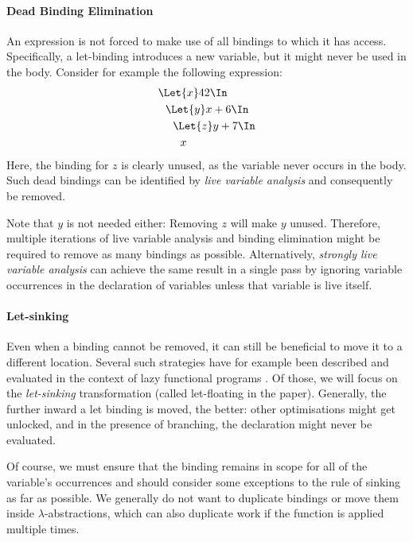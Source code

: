   \paragraph{Dead Binding Elimination}
    An expression is not forced to make use of all bindings to which it has access.
    Specifically, a let-binding introduces a new variable, but it might never be used
    in the body.
    Consider for example the following expression:
    \begin{align*}
      &\Let{x} 42 \In            \\
      &\ \ \Let{y} x + 6 \In     \\
      &\ \ \ \ \Let{z} y + 7 \In \\
      &\ \ \ \ \ \ x
    \end{align*}
    Here, the binding for $z$ is clearly unused, as the variable never occurs in the body.
    Such dead bindings can be identified by \emph{live variable analysis}
    and consequently be removed.

    Note that $y$ is not needed either: Removing $z$ will make $y$ unused.
    Therefore, multiple iterations of live variable analysis and binding elimination
    might be required to remove as many bindings as possible.
    Alternatively, \emph{strongly live variable analysis} can achieve the same result in a single pass
    by ignoring variable occurrences in the declaration of variables
    unless that variable is live itself.

  \paragraph{Let-sinking}
    Even when a binding cannot be removed,
    it can still be beneficial to move it to a different location.
    Several such strategies have for example been described and evaluated
    in the context of lazy functional programs
    \cite{Jones1996LetFloating}.
    Of those, we will focus on the \emph{let-sinking} transformation
    (called let-floating in the paper).
    Generally, the further inward a let binding is moved, the better:
    other optimisations might get unlocked, and in the presence of branching,
    the declaration might never be evaluated.

    Of course, we must ensure that the binding remains in scope
    for all of the variable's occurrences
    and should consider some exceptions to the rule of sinking as far as possible.
    We generally do not want to duplicate bindings
    or move them inside $\lambda$-abstractions, which can also duplicate work
    if the function is applied multiple times.


